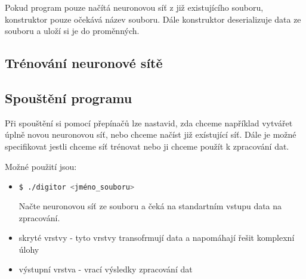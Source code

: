 Pokud program pouze načítá neuronovou síť z již existujícího souboru, konstruktor pouze očekává název souboru.
Dále konstruktor deserializuje data ze souboru a uloží si je do proměnných.

\subsection{Trénování neuronové sítě}

\subsection{Spouštění programu}
Při spouštění si pomocí přepínačů lze nastavid, zda chceme například vytvářet úplně novou neuronovou síť, nebo chceme načíst již exístující síť.
Dále je možné specifikovat jestli chceme síť trénovat nebo ji chceme použít k zpracování dat.

Možné použití jsou:
\begin{itemize}
    \item \begin{lstlisting}[language=bash]
              $ ./digitor <jméno_souboru>
    \end{lstlisting} Načte neuronovou síť ze souboru a čeká na standartním vstupu data na zpracování.
    \item skryté vrstvy - tyto vrstvy transofrmují data a napomáhají řešit komplexní úlohy
    \item výstupní vrstva - vrací výsledky zpracování dat
\end{itemize}
